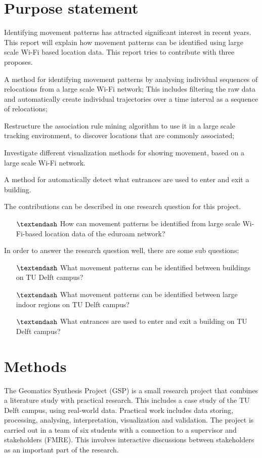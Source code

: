 \section{Purpose statement}\label{purpstate}
Identifying movement patterns has attracted significant interest in recent years. This report will explain how movement patterns can be identified using large scale Wi-Fi based location data. This report tries to contribute with three proposes.
\begin {enumerate*} [label=\itshape\arabic*\upshape),font={\color{red!0!black}\bfseries}] \item A method for identifying movement patterns by analysing individual sequences of relocations from a large scale Wi-Fi network; This includes filtering the raw data and automatically create individual trajectories over a time interval as a sequence of relocations; \item Restructure the association rule mining algorithm to use it in a large scale tracking environment, to discover locations that are commonly associated; \item Investigate different visualization methods for showing movement, based on a large scale Wi-Fi network. \item A method for automatically detect what entrances are used to enter and exit a building.
\end {enumerate*}

The contributions can be described in one research question for this project.
\begin{itemize}
\item[$\textendash$] How can movement patterns be identified from large scale Wi-Fi-based location data of the eduroam network?
\end{itemize}
In order to answer the research question well, there are some sub questions:
\begin{itemize}
\item[$\textendash$] What movement patterns can be identified between buildings on TU Delft campus?
\item[$\textendash$] What movement patterns can be identified between large indoor regions on TU Delft campus?
\item[$\textendash$] What entrances are used to enter and exit a building on TU Delft campus?
\end{itemize}

\section{Methods}\label{methods}
The Geomatics Synthesis Project (GSP) is a small research project that combines a literature study with practical research. This includes a case study of the TU Delft campus, using real-world data. Practical work includes data storing, processing, analysing, interpretation, visualization and validation. The project is carried out in a team of six students with a connection to a supervisor and stakeholders (FMRE). This involves interactive discussions between stakeholders as an important part of the research. 
